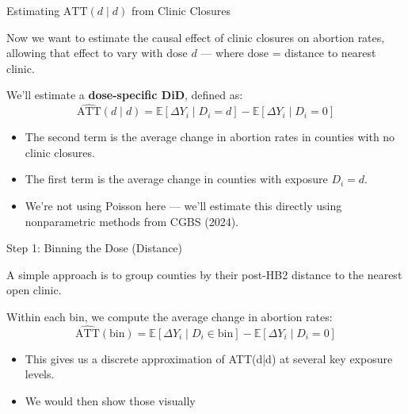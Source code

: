\documentclass{beamer}
\begin{document}
\begin{frame}{Estimating $\text{ATT}(d \mid d)$ from Clinic Closures}

Now we want to estimate the causal effect of clinic closures on abortion rates, allowing that effect to vary with dose $d$ — where dose = distance to nearest clinic.

\medskip

We'll estimate a \textbf{dose-specific DiD}, defined as:
\[
  \widehat{\text{ATT}}(d \mid d) = \mathbb{E}[\Delta Y_i \mid D_i = d] - \mathbb{E}[\Delta Y_i \mid D_i = 0]
\]

\begin{itemize}
  \item The second term is the average change in abortion rates in counties with no clinic closures.
  \item The first term is the average change in counties with exposure $D_i = d$.
  \item We're not using Poisson here — we'll estimate this directly using nonparametric methods from CGBS (2024).
\end{itemize}

\end{frame}



\begin{frame}{Step 1: Binning the Dose (Distance)}

A simple approach is to group counties by their post-HB2 distance to the nearest open clinic.

\medskip

Within each bin, we compute the average change in abortion rates:
\[
\widehat{\text{ATT}}(\text{bin}) = \mathbb{E}[\Delta Y_i \mid D_i \in \text{bin}] - \mathbb{E}[\Delta Y_i \mid D_i = 0]
\]

\begin{itemize}
  \item This gives us a discrete approximation of ATT(d|d) at several key exposure levels.
  \item We would then show those visually
\end{itemize}

\end{frame}
\end{document}
